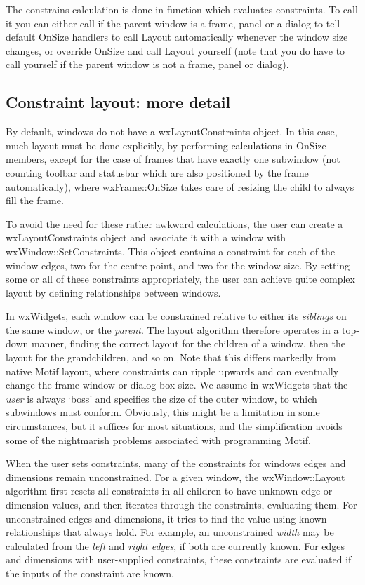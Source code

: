 The constrains calculation is done in  
function which evaluates constraints. To call it you can either call
 if the parent window
is a frame, panel or a dialog to tell default OnSize handlers to call Layout
automatically whenever the window size changes, or override OnSize and call
Layout yourself (note that you do have to call 
 yourself if the parent window is not a
frame, panel or dialog).

\subsection{Constraint layout: more detail}

By default, windows do not have a wxLayoutConstraints object. In this case, much layout
must be done explicitly, by performing calculations in OnSize members, except
for the case of frames that have exactly one subwindow (not counting toolbar and
statusbar which are also positioned by the frame automatically), where wxFrame::OnSize
takes care of resizing the child to always fill the frame.

To avoid the need for these rather awkward calculations, the user can create
a wxLayoutConstraints object and associate it with a window with wxWindow::SetConstraints.
This object contains a constraint for each of the window edges, two for the centre point,
and two for the window size. By setting some or all of these constraints appropriately,
the user can achieve quite complex layout by defining relationships between windows.

In wxWidgets, each window can be constrained relative to either its {\it
siblings} on the same window, or the {\it parent}. The layout algorithm
therefore operates in a top-down manner, finding the correct layout for
the children of a window, then the layout for the grandchildren, and so
on. Note that this differs markedly from native Motif layout, where
constraints can ripple upwards and can eventually change the frame
window or dialog box size. We assume in wxWidgets that the {\it user} is
always `boss' and specifies the size of the outer window, to which
subwindows must conform. Obviously, this might be a limitation in some
circumstances, but it suffices for most situations, and the
simplification avoids some of the nightmarish problems associated with
programming Motif.

When the user sets constraints, many of the constraints for windows
edges and dimensions remain unconstrained. For a given window,
the wxWindow::Layout algorithm first resets all constraints
in all children to have unknown edge or dimension values, and then iterates through the constraints,
evaluating them. For unconstrained edges and dimensions, it
tries to find the value using known relationships that always hold. For example,
an unconstrained {\it width} may be calculated from the {\it left} and {\it right edges}, if
both are currently known. For edges and dimensions with user-supplied constraints, these
constraints are evaluated if the inputs of the constraint are known.

